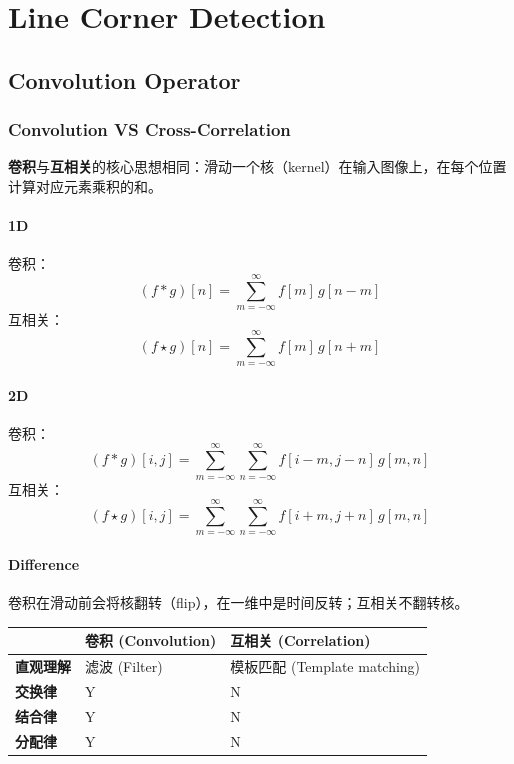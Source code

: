 \section{Line Corner Detection}\label{line-corner-detection}

\subsection{Convolution Operator}\label{convolution-operator}

\subsubsection{Convolution VS
Cross-Correlation}\label{convolution-vs-cross-correlation}

\textbf{卷积}与\textbf{互相关}的核心思想相同：滑动一个核（kernel）在输入图像上，在每个位置计算对应元素乘积的和。

\paragraph{1D}\label{d}

卷积： \[
(f * g)[n] = \sum_{m=-\infty}^{\infty} f[m] \, g[n - m]
\] 互相关： \[
(f \star g)[n] = \sum_{m=-\infty}^{\infty} f[m] \, g[n + m]
\]

\paragraph{2D}\label{d-1}

卷积： \[
(f * g)[i, j] = \sum_{m=-\infty}^{\infty} \sum_{n=-\infty}^{\infty} f[i - m, j - n] \, g[m, n]
\] 互相关： \[
(f \star g)[i, j] = \sum_{m=-\infty}^{\infty} \sum_{n=-\infty}^{\infty} f[i + m, j + n] \, g[m, n]
\]

\paragraph{Difference}\label{difference}

卷积在滑动前会将核翻转（flip），在一维中是时间反转；互相关不翻转核。

\noindent\small
\setlength{\tabcolsep}{2pt}
\begin{tabular}{@{}lp{}p{}@{}}
\hline
 & \textbf{卷积 (Convolution)} & \textbf{互相关 (Correlation)} \\
\hline
\textbf{直观理解} & 滤波 (Filter) & 模板匹配 (Template matching) \\
\textbf{交换律} & Y & N \\
\textbf{结合律} & Y & N \\
\textbf{分配律} & Y & N \\
\hline
\end{tabular}

